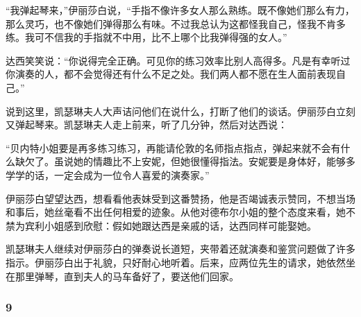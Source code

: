 \par “我弹起琴来，”伊丽莎白说，“手指不像许多女人那么熟练。既不像她们那么有力，那么灵巧，也不像她们弹得那么有味。不过我总认为这都怪我自己，怪我不肯多练。我可不信我的手指就不中用，比不上哪个比我弹得强的女人。”
\par 达西笑笑说：“你说得完全正确。可见你的练习效率比别人高得多。凡是有幸听过你演奏的人，都不会觉得还有什么不足之处。我们两人都不愿在生人面前表现自己。”
\par 说到这里，凯瑟琳夫人大声诘问他们在说什么，打断了他们的谈话。伊丽莎白立刻又弹起琴来。凯瑟琳夫人走上前来，听了几分钟，然后对达西说：
\par “贝内特小姐要是再多练习练习，再能请伦敦的名师指点指点，弹起来就不会有什么缺欠了。虽说她的情趣比不上安妮，但她很懂得指法。安妮要是身体好，能够多学学的话，一定会成为一位令人喜爱的演奏家。”
\par 伊丽莎白望望达西，想看看他表妹受到这番赞扬，他是否竭诚表示赞同，不想当场和事后，她丝毫看不出任何相爱的迹象。从他对德布尔小姐的整个态度来看，她不禁为宾利小姐感到欣慰：假如她跟达西是亲戚的话，达西同样可能娶她。
\par 凯瑟琳夫人继续对伊丽莎白的弹奏说长道短，夹带着还就演奏和鉴赏问题做了许多指示。伊丽莎白出于礼貌，只好耐心地听着。后来，应两位先生的请求，她依然坐在那里弹琴，直到夫人的马车备好了，要送他们回家。



\subsubsection*{9}


